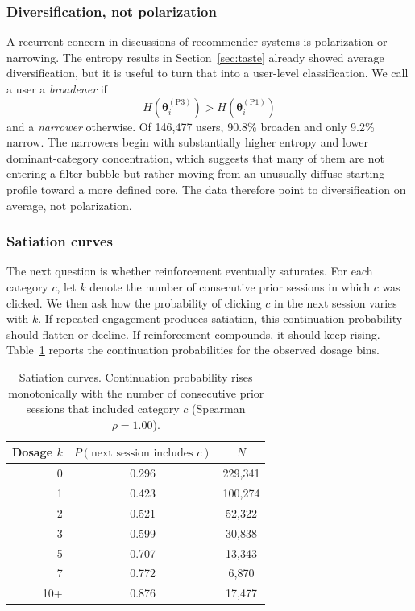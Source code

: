 \documentclass[11pt]{article}
\begin{document}
\subsubsection{Diversification, not polarization}

A recurrent concern in discussions of recommender systems is polarization or narrowing. The entropy results in Section~\ref{sec:taste} already showed average diversification, but it is useful to turn that into a user-level classification. We call a user a \emph{broadener} if
\[
H\!\left(\boldsymbol{\theta}_i^{(\mathrm{P3})}\right)
>
H\!\left(\boldsymbol{\theta}_i^{(\mathrm{P1})}\right)
\]
and a \emph{narrower} otherwise. Of 146,477 users, 90.8\% broaden and only 9.2\% narrow. The narrowers begin with substantially higher entropy and lower dominant-category concentration, which suggests that many of them are not entering a filter bubble but rather moving from an unusually diffuse starting profile toward a more defined core. The data therefore point to diversification on average, not polarization.

\subsubsection{Satiation curves}

The next question is whether reinforcement eventually saturates. For each category $c$, let $k$ denote the number of consecutive prior sessions in which $c$ was clicked. We then ask how the probability of clicking $c$ in the next session varies with $k$. If repeated engagement produces satiation, this continuation probability should flatten or decline. If reinforcement compounds, it should keep rising. Table~\ref{tab:satiation} reports the continuation probabilities for the observed dosage bins.

\begin{table}[ht]
\centering
\caption{Satiation curves. Continuation probability rises monotonically with the number of consecutive prior sessions that included category $c$ (Spearman $\rho = 1.00$).}
\label{tab:satiation}
\begin{tabular}{rcc}
\toprule
Dosage $k$ & $P(\text{next session includes } c)$ & $N$ \\
\midrule
0 & 0.296 & 229,341 \\
1 & 0.423 & 100,274 \\
2 & 0.521 & 52,322 \\
3 & 0.599 & 30,838 \\
5 & 0.707 & 13,343 \\
7 & 0.772 & 6,870 \\
10+ & 0.876 & 17,477 \\
\bottomrule
\end{tabular}
\end{table}
\FloatBarrier
\end{document}

